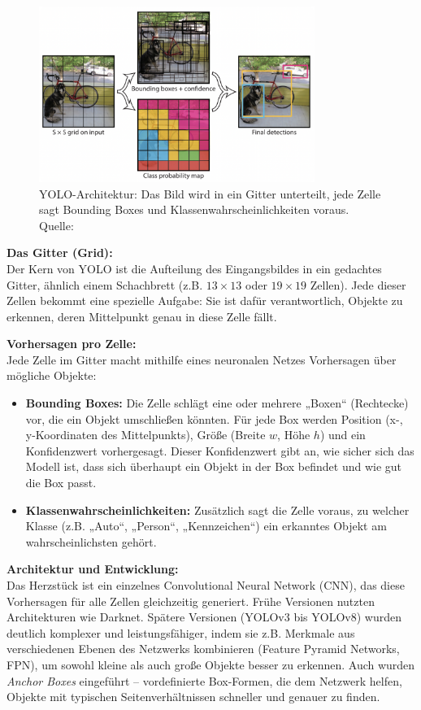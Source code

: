 \begin{figure}[htbp]
    \centering
    \includegraphics[width=0.8\textwidth]{data/yolo_grid.png}
    \caption{YOLO-Architektur: Das Bild wird in ein Gitter unterteilt, jede Zelle sagt Bounding Boxes und Klassenwahrscheinlichkeiten voraus. Quelle: \cite{yolo_grid}}
    \label{fig:yolo_grid}
\end{figure}

\textbf{Das Gitter (Grid):} \\
Der Kern von YOLO ist die Aufteilung des Eingangsbildes in ein gedachtes Gitter, ähnlich einem Schachbrett (z.B. $13 \times 13$ oder $19 \times 19$ Zellen). Jede dieser Zellen bekommt eine spezielle Aufgabe: Sie ist dafür verantwortlich, Objekte zu erkennen, deren Mittelpunkt genau in diese Zelle fällt.

\textbf{Vorhersagen pro Zelle:} \\
Jede Zelle im Gitter macht mithilfe eines neuronalen Netzes Vorhersagen über mögliche Objekte:
\begin{itemize}
    \item \textbf{Bounding Boxes:} Die Zelle schlägt eine oder mehrere „Boxen“ (Rechtecke) vor, die ein Objekt umschließen könnten. Für jede Box werden Position (x-, y-Koordinaten des Mittelpunkts), Größe (Breite $w$, Höhe $h$) und ein Konfidenzwert vorhergesagt. Dieser Konfidenzwert gibt an, wie sicher sich das Modell ist, dass sich überhaupt ein Objekt in der Box befindet und wie gut die Box passt.
    \item \textbf{Klassenwahrscheinlichkeiten:} Zusätzlich sagt die Zelle voraus, zu welcher Klasse (z.B. „Auto“, „Person“, „Kennzeichen“) ein erkanntes Objekt am wahrscheinlichsten gehört.
\end{itemize}

\textbf{Architektur und Entwicklung:} \\
Das Herzstück ist ein einzelnes Convolutional Neural Network (CNN), das diese Vorhersagen für alle Zellen gleichzeitig generiert. Frühe Versionen nutzten Architekturen wie Darknet. Spätere Versionen (YOLOv3 bis YOLOv8) wurden deutlich komplexer und leistungsfähiger, indem sie z.B. Merkmale aus verschiedenen Ebenen des Netzwerks kombinieren (Feature Pyramid Networks, FPN), um sowohl kleine als auch große Objekte besser zu erkennen. Auch wurden \textit{Anchor Boxes} eingeführt – vordefinierte Box-Formen, die dem Netzwerk helfen, Objekte mit typischen Seitenverhältnissen schneller und genauer zu finden.

